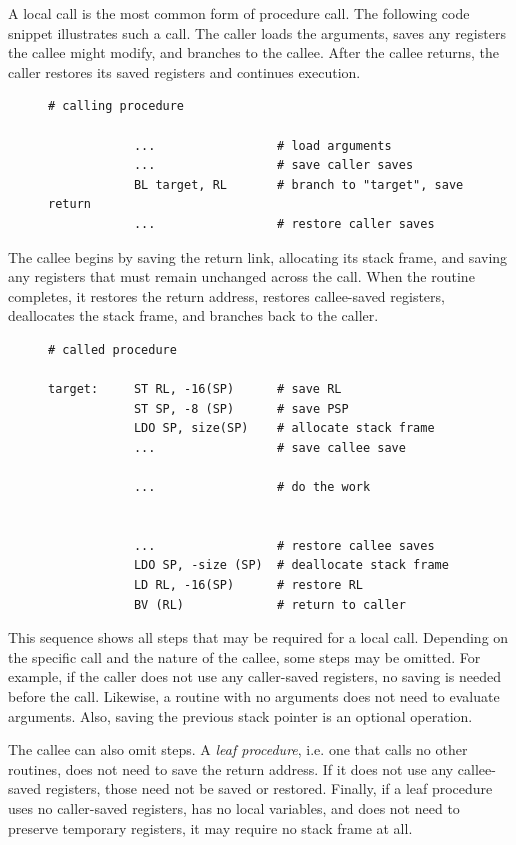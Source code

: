 
A local call is the most common form of procedure call. The following code snippet illustrates such a call. The caller loads the arguments, saves any registers the callee might modify, and branches to the callee. After the callee returns, the caller restores its saved registers and continues execution.

\begin{figure}[H]
\centering
\lstset{style=codesnippetstyle}
\begin{lstlisting}
# calling procedure

			...					# load arguments
			...					# save caller saves
			BL target, RL 		# branch to "target", save return
			...					# restore caller saves
\end{lstlisting}
\end{figure}


The callee begins by saving the return link, allocating its stack frame, and saving any registers that must remain unchanged across the call. When the routine completes, it restores the return address, restores callee-saved registers, deallocates the stack frame, and branches back to the caller.

\begin{figure}[H]
\centering

\lstset{style=codesnippetstyle}
\begin{lstlisting}
# called procedure
            
target:     ST RL, -16(SP)	    # save RL
			ST SP, -8 (SP)      # save PSP
			LDO SP, size(SP) 	# allocate stack frame
			...					# save callee save
			
			...					# do the work
			
			
			...					# restore callee saves
			LDO SP, -size (SP)  # deallocate stack frame
			LD RL, -16(SP)		# restore RL
			BV (RL) 			# return to caller
\end{lstlisting}
\end{figure}

This sequence shows all steps that may be required for a local call. Depending on the specific call and the nature of the callee, some steps may be omitted. For example, if the caller does not use any caller-saved registers, no saving is needed before the call. Likewise, a routine with no arguments does not need to evaluate arguments. Also, saving the previous stack pointer is an optional operation.

The callee can also omit steps. A \emph{leaf procedure}, i.e. one that calls no other routines, does not need to save the return address. If it does not use any callee-saved registers, those need not be saved or restored. Finally, if a leaf procedure uses no caller-saved registers, has no local variables, and does not need to preserve temporary registers, it may require no stack frame at all.

